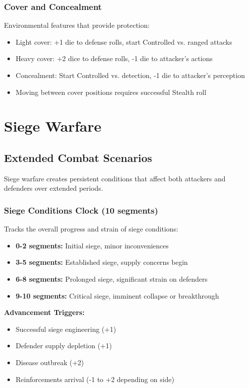 \subsubsection{Cover and Concealment}

Environmental features that provide protection:
\begin{itemize}[leftmargin=*]
    \item Light cover: +1 die to defense rolls, start Controlled vs. ranged attacks
    \item Heavy cover: +2 dice to defense rolls, -1 die to attacker's actions
    \item Concealment: Start Controlled vs. detection, -1 die to attacker's perception
    \item Moving between cover positions requires successful Stealth roll
\end{itemize}

\newpage

\section{Siege Warfare}

\subsection{Extended Combat Scenarios}

Siege warfare creates persistent conditions that affect both attackers and defenders over extended periods.

\subsubsection{Siege Conditions Clock (10 segments)}

Tracks the overall progress and strain of siege conditions:
\begin{itemize}[leftmargin=*]
    \item \textbf{0-2 segments:} Initial siege, minor inconveniences
    \item \textbf{3-5 segments:} Established siege, supply concerns begin
    \item \textbf{6-8 segments:} Prolonged siege, significant strain on defenders
    \item \textbf{9-10 segments:} Critical siege, imminent collapse or breakthrough
\end{itemize}

\textbf{Advancement Triggers:}
\begin{itemize}[leftmargin=*]
    \item Successful siege engineering (+1)
    \item Defender supply depletion (+1)
    \item Disease outbreak (+2)
    \item Reinforcements arrival (-1 to +2 depending on side)
\end{itemize}

